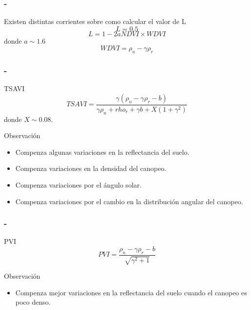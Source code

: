 \documentclass[handout]{beamer}
\begin{document}
\begin{frame}
    \frametitle{\secname-\subsecname}
    Existen distintas corrientes sobre como calcular el valor de L
    \begin{equation}
        L=0.5
    \end{equation}\pause
    \begin{equation}
        L = 1-2 a NDVI \times WDVI
    \end{equation}\pause
    donde $a\sim 1.6$
    \begin{equation}
        WDVI = \rho_n -\gamma \rho_r
    \end{equation}
\end{frame}

\begin{frame}
    \frametitle{\secname-\subsecname}
    \begin{block}{TSAVI}
        \begin{equation}
            TSAVI =
            \frac{\gamma(\rho_n-\gamma\rho_r-b)}{\gamma\rho_n+rho_r+\gamma b
            +X(1+\gamma^2)} 
        \end{equation}
        donde $X\sim0.08$.
    \end{block}\pause
    \begin{block}{Observaci\'on}
        \begin{itemize}[<+->]
            \item Compenza algunas variaciones en la reflectancia del suelo.
            \item Compenza variaciones en la densidad del canopeo.
            \item Compenza variaciones por el \'angulo solar.
            \item Compenza variaciones por el cambio en la distribuci\'on
                angular del canopeo.
        \end{itemize}
    \end{block}
\end{frame}

\begin{frame}
    \frametitle{\secname-\subsecname}
    \begin{block}{PVI}
        \begin{equation}
            PVI = \frac{\rho_n-\gamma\rho_r-b}{\sqrt{\gamma^2+1}}
        \end{equation}
    \end{block}\pause
    \begin{block}{Observaci\'on}
        \begin{itemize}
            \item Compenza mejor variaciones en la reflectancia del suelo cuando
                el canopeo es poco denso.
        \end{itemize}
    \end{block}
\end{frame}
\end{document}
